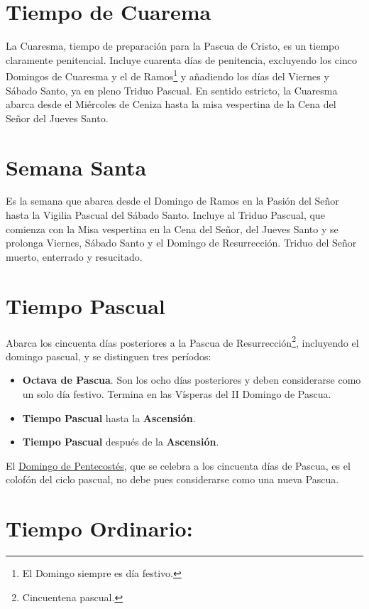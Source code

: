 \documentclass[letterpaper, 12pt]{book}
\begin{document}
    \section{Tiempo de Cuarema}
    La Cuaresma, tiempo de preparaci\'on para la Pascua de Cristo, es un tiempo claramente penitencial. Incluye cuarenta d\'ias de penitencia, excluyendo los cinco Domingos de Cuaresma y el de Ramos\footnote{El Domingo siempre es d\'ia festivo.} y a\~nadiendo los d\'ias del Viernes y S\'abado Santo, ya en pleno Triduo Pascual. En sentido estricto, la Cuaresma abarca desde el Mi\'ercoles de Ceniza hasta la misa vespertina de la Cena del Se\~nor del Jueves Santo.
    
    \section{Semana Santa}
    Es la semana que abarca desde el Domingo de Ramos en la Pasi\'on del Se\~nor hasta la Vigilia Pascual del S\'abado Santo. Incluye al Triduo Pascual, que comienza con la Misa vespertina en la Cena del Se\~nor, del Jueves Santo y se prolonga Viernes, S\'abado Santo y el Domingo de Resurrecci\'on. Triduo del Se\~nor muerto, enterrado y resucitado.
    
    \section{Tiempo Pascual}
    Abarca los cincuenta d\'ias posteriores a la Pascua de Resurrecci\'on\footnote{Cincuentena pascual.}, incluyendo el domingo pascual, y se distinguen tres per\'iodos:
    
    \begin{itemize}
        \item \textbf{Octava de Pascua}. Son los ocho d\'ias posteriores y deben considerarse como un solo d\'ia festivo. Termina en las V\'isperas del II Domingo de Pascua.
        \item \textbf{Tiempo Pascual} hasta la \textbf{Ascensi\'on}.
        \item \textbf{Tiempo Pascual} despu\'es de la \textbf{Ascensión}.
    \end{itemize}
    
    El \underline{Domingo de Pentecost\'es}, que se celebra a los cincuenta d\'ias de Pascua, es el colof\'on del ciclo pascual, no debe pues considerarse como una nueva Pascua.
    
    \section{Tiempo Ordinario:}
\end{document}
